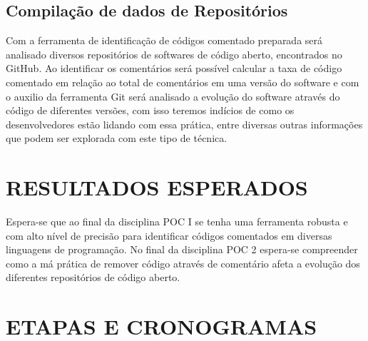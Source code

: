 \documentclass{abnt}
\begin{document}
\section{Compilação de dados de Repositórios}

Com a ferramenta de identificação de códigos comentado preparada será analisado 
diversos repositórios de softwares de código aberto, encontrados
no GitHub. Ao identificar os comentários será possível calcular a taxa de 
código comentado em relação ao total de comentários em uma versão do 
software e com o auxilio da ferramenta Git será analisado a evolução do 
software através do código de diferentes versões, com isso teremos 
indícios de como os desenvolvedores estão lidando com essa prática, entre 
diversas outras informações que podem ser explorada com este tipo
de técnica.

\chapter{RESULTADOS ESPERADOS}

Espera-se que ao final da disciplina POC I se tenha uma ferramenta robusta e
com alto nível de precisão para identificar códigos comentados em diversas
linguagens de programação. No final da disciplina POC 2
espera-se compreender como a má prática de remover código através de 
comentário afeta a evolução dos diferentes repositórios de código aberto.

\chapter{ETAPAS E CRONOGRAMAS}




\end{document}
